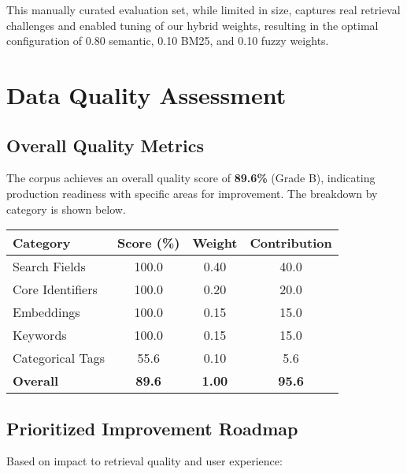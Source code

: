 This manually curated evaluation set, while limited in size, captures real retrieval challenges and enabled tuning of our hybrid weights, resulting in the optimal configuration of 0.80 semantic, 0.10 BM25, and 0.10 fuzzy weights.

\section{Data Quality Assessment}

\subsection{Overall Quality Metrics}

The corpus achieves an overall quality score of \textbf{89.6\%} (Grade B), indicating production readiness with specific areas for improvement. The breakdown by category is shown below.

\vspace{0.5em}
\noindent
\begin{minipage}{\textwidth}
\centering
\begin{tabular}{lccc}
\toprule
\textbf{Category} & \textbf{Score (\%)} & \textbf{Weight} & \textbf{Contribution} \\
\midrule
Search Fields & 100.0 & 0.40 & 40.0 \\
Core Identifiers & 100.0 & 0.20 & 20.0 \\
Embeddings & 100.0 & 0.15 & 15.0 \\
Keywords & 100.0 & 0.15 & 15.0 \\
Categorical Tags & 55.6 & 0.10 & 5.6 \\
\midrule
\textbf{Overall} & \textbf{89.6} & \textbf{1.00} & \textbf{95.6} \\
\bottomrule
\end{tabular}
\label{tab:quality-breakdown}
\end{minipage}
\vspace{0.5em}

\subsection{Prioritized Improvement Roadmap}

Based on impact to retrieval quality and user experience:

